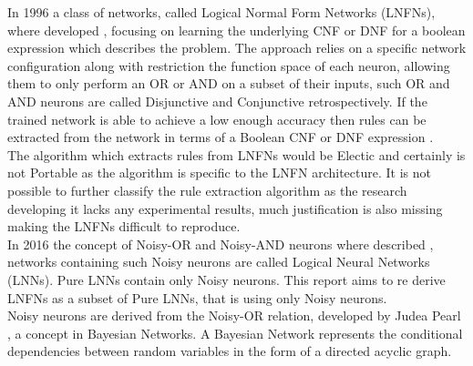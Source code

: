 In 1996 a class of networks, called Logical Normal Form Networks (LNFNs), where developed \cite{herrmann1996backpropagation}, focusing on learning the underlying CNF or DNF for a boolean expression which describes the problem. The approach relies on a specific network configuration along with restriction the function space of each neuron, allowing them to only perform an OR or AND on a subset of their inputs, such OR and AND neurons are called Disjunctive and Conjunctive retrospectively. If the trained network is able to achieve a low enough accuracy then rules can be extracted from the network in terms of a Boolean CNF or DNF expression \cite{herrmann1996backpropagation}.\\

The algorithm which extracts rules from LNFNs would be Electic and certainly is not Portable as the algorithm is specific to the LNFN architecture. It is not possible to further classify the rule extraction algorithm as the research developing it lacks any experimental results, much justification is also missing making the LNFNs difficult to reproduce.\\

In 2016 the concept of Noisy-OR and Noisy-AND neurons where described \cite{LearningLogicalActivations}, networks containing such Noisy neurons are called Logical Neural Networks (LNNs). Pure LNNs contain only Noisy neurons. This report aims to re derive LNFNs as a subset of Pure LNNs, that is using only Noisy neurons.\\

Noisy neurons are derived from the Noisy-OR relation\cite{LearningLogicalActivations}, developed by Judea Pearl \cite{russell1995modern}, a concept in Bayesian Networks. A Bayesian Network represents the conditional dependencies between random variables in the form of a directed acyclic graph.

